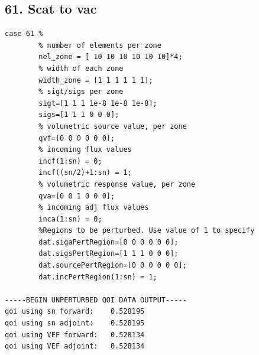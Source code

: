 \documentclass{article}
\begin{document}
\subsection{61. Scat to vac}
\begin{verbatim}
case 61 %
        % number of elements per zone
        nel_zone = [ 10 10 10 10 10 10]*4;
        % width of each zone
        width_zone = [1 1 1 1 1 1];
        % sigt/sigs per zone
        sigt=[1 1 1 1e-8 1e-8 1e-8];
        sigs=[1 1 1 0 0 0];
        % volumetric source value, per zone
        qvf=[0 0 0 0 0 0];
        % incoming flux values
        incf(1:sn) = 0;
        incf((sn/2)+1:sn) = 1;
        % volumetric response value, per zone
        qva=[0 0 1 0 0 0];
        % incoming adj flux values
        inca(1:sn) = 0;
        %Regions to be perturbed. Use value of 1 to specify
        dat.sigaPertRegion=[0 0 0 0 0 0];
        dat.sigsPertRegion=[1 1 1 0 0 0];
        dat.sourcePertRegion=[0 0 0 0 0 0];
        dat.incPertRegion(1:sn) = 1;
        
-----BEGIN UNPERTURBED QOI DATA OUTPUT----- 
qoi using sn forward: 	 0.528195 
qoi using sn adjoint: 	 0.528195 
qoi using VEF forward: 	 0.528134 
qoi using VEF adjoint: 	 0.528134 
\end{verbatim}
\end{document}
